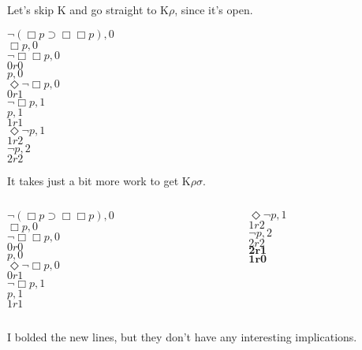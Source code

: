\documentclass[
  14pt,
  letterpaper,
  ignorenonframetext,
]{beamer}
\begin{document}
\begin{frame}
Let's skip K and go straight to K\(\rho\), since it's open.

\begin{center}
$\neg(\Box p \supset \Box \Box p), 0$ \\
$\Box p, 0$ \\
$\neg \Box \Box p, 0$ \\
$0r0$ \\
$p, 0$ \\
$\Diamond \neg \Box p, 0$ \\
$0r1$ \\
$\neg \Box p, 1$ \\
$p, 1$ \\
$1r1$ \\
$\Diamond \neg p, 1$ \\
$1r2$ \\
$\neg p, 2$ \\
$2r2$
\end{center}
\end{frame}

\begin{frame}
It takes just a bit more work to get K\(\rho \sigma\).

\begin{columns}[T]
\begin{column}{0.65\textwidth}
\begin{center}
$\neg(\Box p \supset \Box \Box p), 0$ \\
$\Box p, 0$ \\
$\neg \Box \Box p, 0$ \\
$0r0$ \\
$p, 0$ \\
$\Diamond \neg \Box p, 0$ \\
$0r1$ \\
$\neg \Box p, 1$ \\
$p, 1$ \\
$1r1$ \\
\end{center}
\end{column}

\begin{column}{0.35\textwidth}
\begin{center}
$\Diamond \neg p, 1$ \\
$1r2$ \\
$\neg p, 2$ \\
$2r2$ \\
$\mathbf{2r1}$ \\
$\mathbf{1r0}$ \\
\end{center}
\end{column}
\end{columns}

I bolded the new lines, but they don't have any interesting
implications.
\end{frame}
\end{document}
